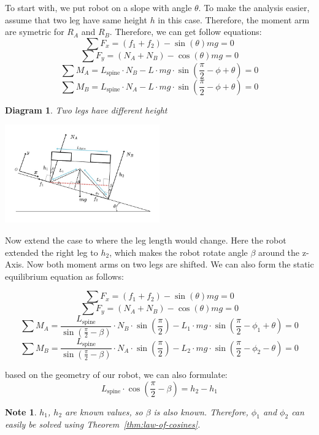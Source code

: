 \documentclass[11pt]{article}
\newtheorem{diagram}[statement]{Diagram}
\newtheorem{note}[statement]{Note}
\begin{document}
To start with,  we put robot on a slope with angle \(\theta\). To make the analysis easier,
assume that two leg have same height \(h\) in this case. Therefore, the moment arm are symetric
for \(R_A\) and \(R_B\). Therefore, we can get follow equations:
\[ \sum F_x = (f_1+f_2) - \sin(\theta)mg = 0 \]
\[ \sum F_y = (N_A+N_B) - \cos(\theta)mg = 0 \]
\[ \sum M_A = L_\text{spine} \cdot N_B -  L \cdot mg \cdot \sin(\frac{\pi}{2}-\phi+\theta) = 0 \]
\[ \sum M_B = L_\text{spine} \cdot N_A -  L \cdot mg \cdot \sin(\frac{\pi}{2}-\phi+\theta) = 0 \]

\begin{diagram}
    Two legs have different height
\end{diagram}\label{ass:h2-larger-than-h1}
\vspace{1ex} %
\begin{center}
    \includegraphics[width=0.5\textwidth]{figs/Two legs have different height.jpg} %
\end{center}

Now extend the case to where the leg length would change. Here the robot extended
the right leg to \(h_2\), which makes the robot rotate angle \(\beta\) around
the z-Axis. Now both moment arms on two legs are 
shifted. We can also form the static equilibrium equation as follows:

\[ \sum F_x = (f_1+f_2) - \sin(\theta)mg = 0 \]
\[ \sum F_y = (N_A+N_B) - \cos(\theta)mg = 0 \]
\[ \sum M_A = \frac{L_\text{spine}}{\sin(\frac{\pi}{2}-\beta)} \cdot N_B \cdot \sin(\frac{\pi}{2})-  L_1 \cdot mg \cdot \sin(\frac{\pi}{2}-\phi_1+\theta) = 0 \]
\[ \sum M_B = \frac{L_\text{spine}}{\sin(\frac{\pi}{2}-\beta)} \cdot N_A \cdot \sin(\frac{\pi}{2})-  L_2 \cdot mg \cdot \sin(\frac{\pi}{2}-\phi_2-\theta) = 0 \]

based on the geometry of our robot, we can also formulate:
\[L_\text{spine} \cdot \cos(\frac{\pi}{2}-\beta) = h_2 - h_1 \]

\begin{note}\label{not:what-is-known}
\(h_1\), \(h_2\) are known values, so \(\beta\) is also known.  
Therefore, \(\phi_1\) and \(\phi_2\) can easily be solved using Theorem~\ref{thm:law-of-cosines}.
\end{note}
\end{document}
